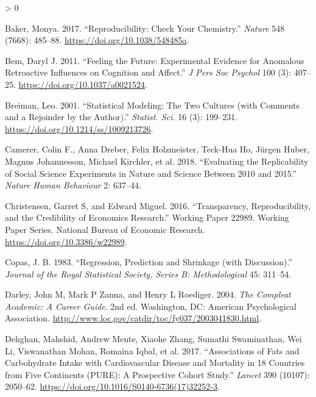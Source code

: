 \documentclass[
  12pt,
]{book}
\newlength{\cslhangindent}
\newenvironment{CSLReferences}[2] %
 {%
  \setlength{\parindent}{0pt}
  \ifodd #1 \everypar{\setlength{\hangindent}{\cslhangindent}}\ignorespaces\fi
  \ifnum #2 > 0
  \setlength{\parskip}{#2\baselineskip}
  \fi
 }%
 {}
\begin{document}
\hypertarget{refs}{}
\begin{CSLReferences}{1}{0}
\leavevmode\hypertarget{ref-bake:2017}{}%
Baker, Monya. 2017. {``Reproducibility: Check Your Chemistry.''} \emph{Nature} 548 (7668): 485--88. \url{https://doi.org/10.1038/548485a}.

\leavevmode\hypertarget{ref-bem:2011}{}%
Bem, Daryl J. 2011. {``Feeling the Future: Experimental Evidence for Anomalous Retroactive Influences on Cognition and Affect.''} \emph{J Pers Soc Psychol} 100 (3): 407--25. \url{https://doi.org/10.1037/a0021524}.

\leavevmode\hypertarget{ref-breiman2001}{}%
Breiman, Leo. 2001. {``Statistical Modeling: The Two Cultures (with Comments and a Rejoinder by the Author).''} \emph{Statist. Sci.} 16 (3): 199--231. \url{https://doi.org/10.1214/ss/1009213726}.

\leavevmode\hypertarget{ref-Camerer2018EvaluatingTR}{}%
Camerer, Colin F., Anna Dreber, Felix Holzmeister, Teck-Hua Ho, Jürgen Huber, Magnus Johannesson, Michael Kirchler, et al. 2018. {``Evaluating the Replicability of Social Science Experiments in Nature and Science Between 2010 and 2015.''} \emph{Nature Human Behaviour} 2: 637--44.

\leavevmode\hypertarget{ref-NBERw22989}{}%
Christensen, Garret S, and Edward Miguel. 2016. {``Transparency, Reproducibility, and the Credibility of Economics Research.''} Working Paper 22989. Working Paper Series. National Bureau of Economic Research. \url{https://doi.org/10.3386/w22989}.

\leavevmode\hypertarget{ref-copa:1983}{}%
Copas, J. B. 1983. {``Regression, Prediction and Shrinkage (with Discussion).''} \emph{Journal of the Royal Statistical Society, Series B: Methodological} 45: 311--54.

\leavevmode\hypertarget{ref-darl:zann:roed:2004}{}%
Darley, John M, Mark P Zanna, and Henry L Roediger. 2004. \emph{The Compleat Academic: A Career Guide}. 2nd ed. Washington, DC: American Psychological Association. \url{http://www.loc.gov/catdir/toc/fy037/2003041830.html}.

\leavevmode\hypertarget{ref-dehg:ment:zhan:2017}{}%
Dehghan, Mahshid, Andrew Mente, Xiaohe Zhang, Sumathi Swaminathan, Wei Li, Viswanathan Mohan, Romaina Iqbal, et al. 2017. {``Associations of Fats and Carbohydrate Intake with Cardiovascular Disease and Mortality in 18 Countries from Five Continents (PURE): A Prospective Cohort Study.''} \emph{Lancet} 390 (10107): 2050--62. \url{https://doi.org/10.1016/S0140-6736(17)32252-3}.


\end{CSLReferences}
\end{document}
